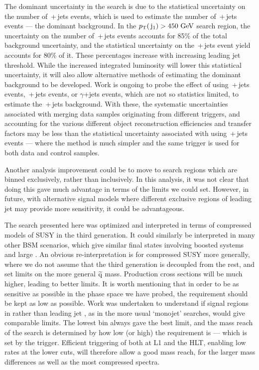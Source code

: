 The dominant uncertainty in the search is due to the statistical uncertainty on the number of \zmumubr{}\,+\,jets events, which is used to estimate the number of \znunubr{}\,+\,jets events --- the dominant background. 
In the $p_{\text{T}}(\,\mathrm{j}_1)>450~\mathrm{GeV}$ search region, the uncertainty on the number of \znunubr{}\,+\,jets events accounts for 85\% of the total background uncertainty, and the statistical uncertainty on the \zmumubr{}\,+\,jets event yield accounts for 80\% of it. These percentages increase with increasing leading jet threshold.
While the increased integrated luminosity will lower this statistical uncertainty, it will also allow alternative methods of estimating the dominant background to be developed.
Work is ongoing to probe the effect of using \wmunubr\,+\,jets events, \wenubr\,+\,jets events, or $\gamma$+jets events, which are not so statistics limited, to estimate the \znunubr{}\,+\,jets background. 
With these, the systematic uncertainties associated with merging data samples originating from different triggers, and accounting for the various different object reconstruction efficiencies and transfer factors may be less than the statistical uncertainty associated with using \zmumubr{}\,+\,jets events --- where the method is much simpler and the same trigger is used for both data and control samples. 

Another analysis improvement could be to move to search regions which are binned exclusively, rather than inclusively. 
In this analysis, it was not clear that doing this gave much advantage in terms of the limits we could set. 
However, in future, with alternative signal models where different exclusive regions of leading jet \pt may provide more sensitivity, it could be advantageous.

The search presented here was optimized and interpreted in terms of compressed models of \ac{SUSY} in the third generation. 
It could similarly be interpreted in many other \ac{BSM} scenarios, which give similar final states involving boosted systems and large \MET. 
An obvious re-interpretation is for compressed \ac{SUSY} more generally, where we do not assume that the third generation is decoupled from the rest, and set limits on the more general $\widetilde{{\rm q}}$ mass. 
Production cross sections will be much higher, leading to better limits. 
It is worth mentioning that in order to be as sensitive as possible in the phase space we have probed, the \MET requirement should be kept as low as possible. 
Work was undertaken to understand if signal regions in \MET rather than leading jet \pt, as in the more usual `monojet' searches, would give comparable limits. 
The lowest \MET bin always gave the best limit, and the mass reach of the search is determined by how low (or high) the \MET requirement is --- which is set by the trigger. 
Efficient triggering of \MET both at \ac{L1} and the \ac{HLT}, enabling low rates at the lower \MET cuts, will therefore allow a good mass reach, for the larger mass differences as well as the most compressed spectra. 


